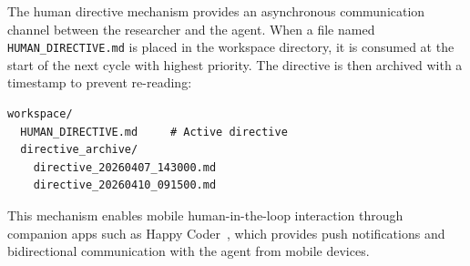 The human directive mechanism provides an asynchronous communication channel between the researcher and the agent. When a file named \texttt{HUMAN\_DIRECTIVE.md} is placed in the workspace directory, it is consumed at the start of the next cycle with highest priority. The directive is then archived with a timestamp to prevent re-reading:

{\small
\begin{verbatim}
workspace/
  HUMAN_DIRECTIVE.md     # Active directive
  directive_archive/
    directive_20260407_143000.md
    directive_20260410_091500.md
\end{verbatim}
}

This mechanism enables mobile human-in-the-loop interaction through companion apps such as Happy Coder~\cite{happy-coder}, which provides push notifications and bidirectional communication with the agent from mobile devices.
